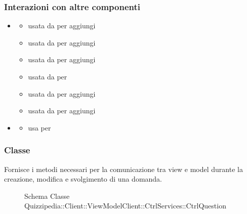 \subsubsection{Interazioni con altre componenti}
\begin{itemize}
\item {}
\begin{itemize}
\item usata da  per aggiungi
\item usata da  per aggiungi
\item usata da  per aggiungi
\item usata da  per 
\item usata da  per aggiungi
\item usata da  per aggiungi
\end{itemize}
\item {}
\begin{itemize}
\item usa  per 
\end{itemize}
\end{itemize}
\subsubsection{Classe }
Fornisce i metodi necessari per la comunicazione tra view e model durante la creazione, modifica e svolgimento di una domanda.
\begin{figure}[H]
\centering
\noindent{}
\caption[Schema Classe CtrlQuestion]{Schema Classe Quizzipedia::Client::ViewModelClient::CtrlServices::CtrlQuestion}
\end{figure}
